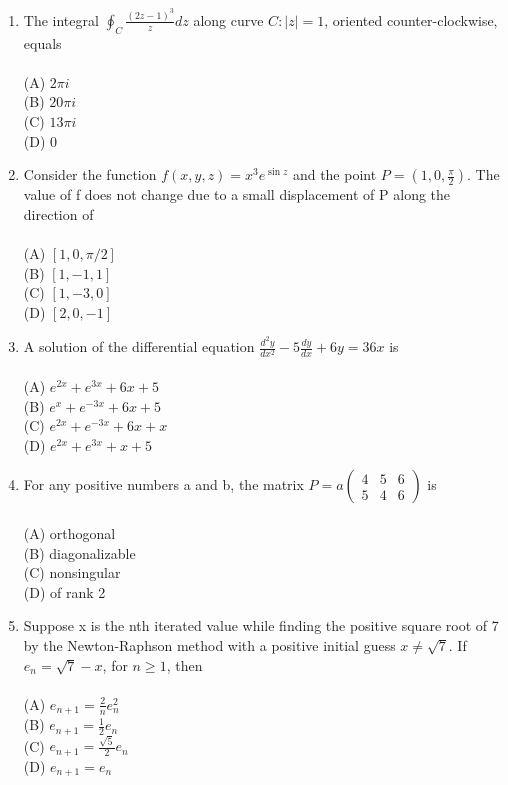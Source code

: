 \documentclass[journal,12pt,onecolumn]{IEEEtran}
\newcommand{\myvec}[1]{\begin{pmatrix}#1\end{pmatrix}}
\begin{document}
\begin{enumerate}[label=\textbf{Q\arabic*.},itemsep=2em]
\item The integral $\oint_C \frac{(2z-1)^3}{z} dz$ along curve $C: |z| = 1$, oriented counter-clockwise, equals \\
\vspace{0.2cm}
\hfill{} \\
(A) $2\pi i$ \\
(B) $20\pi i$ \\
(C) $13\pi i$ \\
(D) 0

\item Consider the function $f(x,y,z) = x^3 e^{\sin z}$ and the point $P = (1,0, \frac{\pi}{2})$. The value of f does not change due to a small displacement of P along the direction of \\
\vspace{0.2cm}
\hfill{} \\
(A) $[1,0,\pi/2]$ \\
(B) $[1,-1,1]$ \\
(C) $[1,-3,0]$ \\
(D) $[2,0,-1]$

\newpage
\item A solution of the differential equation $\frac{d^2 y}{dx^2} - 5 \frac{dy}{dx} + 6y = 36x$ is \\
\vspace{0.2cm}
\hfill{} \\
(A) $e^{2x} + e^{3x} + 6x + 5$ \\
(B) $e^x + e^{-3x} + 6x + 5$ \\
(C) $e^{2x} + e^{-3x} + 6x + x$ \\
(D) $e^{2x} + e^{3x} + x + 5$

\item For any positive numbers a and b, the matrix 
$P = a\myvec{4 & 5 & 6 \\ 5 & 4 & 6}$ is \\
\vspace{0.2cm}
\hfill{} \\
(A) orthogonal \\
(B) diagonalizable \\
(C) nonsingular \\
(D) of rank 2

\item Suppose x is the nth iterated value while finding the positive square root of 7 by the Newton-Raphson method with a positive initial guess $x \neq \sqrt{7}$. If $e_n = \sqrt{7} - x$, for $n \geq 1$, then \\
\vspace{0.2cm}
\hfill{} \\
(A) $e_{n+1} = \frac{2}{n} e_n^2$ \\
\vspace{0.2cm}
(B) $e_{n+1} = \frac{1}{2} e_n$ \\
\vspace{0.2cm}
(C) $e_{n+1} = \frac{\sqrt{5}}{2} e_n$ \\
(D) $e_{n+1} = e_n$


\end{enumerate}
\end{document}
